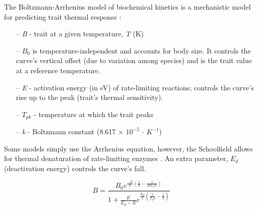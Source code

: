 \documentclass[11pt]{article}
\begin{document}
The Boltzmann-Arrhenius model of biochemical kinetics is a mechanistic model for predicting trait thermal response \cite{Knies2010}:
\begin{itemize}
	\item[--] \textit{B} - trait at a given temperature, \textit{T} (K)
	\item[--] $B_{0}$ is temperature-independent and accounts for body size. It controls the curve's vertical offset (due to variation among species) and is the trait value at a reference temperature.
	\item[--] \textit{E} - activation energy (in eV) of rate-limiting reactions; controls the curve's rise up to the peak (trait's thermal sensitivity).
	\item[--] $T_{pk}$ - temperature at which the trait peaks
	\item[--] \textit{k} - Boltzmann constant (8.617 $\times$ $10^{-5}$ $\cdot$ $K^{-1}$)
\end{itemize}
Some models simply use the Arrhenius equation,
however, the Schoolfield allows for thermal denaturation of rate-limiting enzymes \cite{Knies2010, SchoolfieldSharpe1981}.
An extra parameter, $E_{d}$ (deactivation energy) controls the curve's fall.

\begin{equation}
B =
\frac{B_{0}
	e^{\frac{-E}{k}
		(\frac{1}{T}-\frac{1}{283.15})}}
{1 + \frac{E}{E_d - E}
	e^{\frac{E_d}{k}(\frac{1}{T_pk}-\frac{1}{T})}}
\end{equation}
\end{document}
